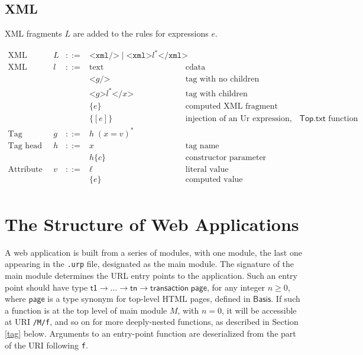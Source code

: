 \documentclass{article}
\newcommand{\mt}[1]{\mathsf{#1}}
\begin{document}
\subsection{XML}

XML fragments $L$ are added to the rules for expressions $e$.

$$\begin{array}{rrcll}
  \textrm{XML fragments} & L &::=& \texttt{<xml/>} \mid \texttt{<xml>}l^*\texttt{</xml>} \\
  \textrm{XML pieces} & l &::=& \textrm{text} & \textrm{cdata} \\
  &&& \texttt{<}g\texttt{/>} & \textrm{tag with no children} \\
  &&& \texttt{<}g\texttt{>}l^*\texttt{</}x\texttt{>} & \textrm{tag with children} \\
  &&& \{e\} & \textrm{computed XML fragment} \\
  &&& \{[e]\} & \textrm{injection of an Ur expression, via the $\mt{Top}.\mt{txt}$ function} \\
  \textrm{Tag} & g &::=& h \; (x = v)^* \\
  \textrm{Tag head} & h &::=& x & \textrm{tag name} \\
  &&& h\{c\} & \textrm{constructor parameter} \\
  \textrm{Attribute value} & v &::=& \ell & \textrm{literal value} \\
  &&& \{e\} & \textrm{computed value} \\
\end{array}$$


\section{The Structure of Web Applications}

A web application is built from a series of modules, with one module, the last one appearing in the \texttt{.urp} file, designated as the main module.  The signature of the main module determines the URL entry points to the application.  Such an entry point should have type $\mt{t1} \to \ldots \to \mt{tn} \to \mt{transaction} \; \mt{page}$, for any integer $n \geq 0$, where $\mt{page}$ is a type synonym for top-level HTML pages, defined in $\mt{Basis}$.  If such a function is at the top level of main module $M$, with $n = 0$, it will be accessible at URI \texttt{/M/f}, and so on for more deeply-nested functions, as described in Section \ref{tag} below.  Arguments to an entry-point function are deserialized from the part of the URI following \texttt{f}.
\end{document}
